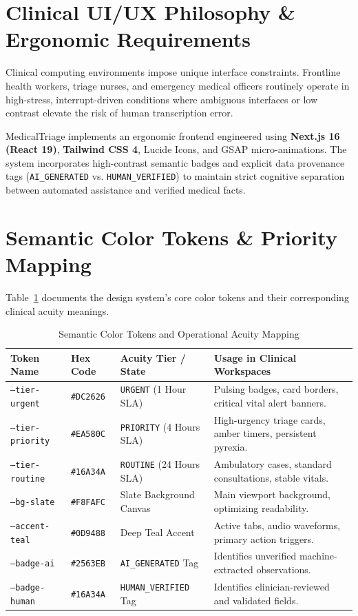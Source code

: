 \documentclass[11pt,a4paper,oneside]{report}
\begin{document}
\section{Clinical UI/UX Philosophy \& Ergonomic Requirements}
Clinical computing environments impose unique interface constraints. Frontline health workers, triage nurses, and emergency medical officers routinely operate in high-stress, interrupt-driven conditions where ambiguous interfaces or low contrast elevate the risk of human transcription error.

MedicalTriage implements an ergonomic frontend engineered using \textbf{Next.js 16 (React 19)}, \textbf{Tailwind CSS 4}, Lucide Icons, and GSAP micro-animations. The system incorporates high-contrast semantic badges and explicit data provenance tags (\texttt{AI\_GENERATED} vs. \texttt{HUMAN\_VERIFIED}) to maintain strict cognitive separation between automated assistance and verified medical facts.

\section{Semantic Color Tokens \& Priority Mapping}
Table~\ref{tab:color_tokens} documents the design system's core color tokens and their corresponding clinical acuity meanings.

\begin{table}[htbp]
  \centering
  \small
  \caption{Semantic Color Tokens and Operational Acuity Mapping}
  \label{tab:color_tokens}
  \begin{tabularx}{\textwidth}{lp{2.0cm}p{3.2cm}X}
    \toprule
    \textbf{Token Name} & \textbf{Hex Code} & \textbf{Acuity Tier / State} & \textbf{Usage in Clinical Workspaces} \\
    \midrule
    \texttt{--tier-urgent} & \texttt{\#DC2626} & \texttt{URGENT} (1 Hour SLA) & Pulsing badges, card borders, critical vital alert banners. \\
    \addlinespace
    \texttt{--tier-priority} & \texttt{\#EA580C} & \texttt{PRIORITY} (4 Hours SLA) & High-urgency triage cards, amber timers, persistent pyrexia. \\
    \addlinespace
    \texttt{--tier-routine} & \texttt{\#16A34A} & \texttt{ROUTINE} (24 Hours SLA) & Ambulatory cases, standard consultations, stable vitals. \\
    \addlinespace
    \texttt{--bg-slate} & \texttt{\#F8FAFC} & Slate Background Canvas & Main viewport background, optimizing readability. \\
    \addlinespace
    \texttt{--accent-teal} & \texttt{\#0D9488} & Deep Teal Accent & Active tabs, audio waveforms, primary action triggers. \\
    \addlinespace
    \texttt{--badge-ai} & \texttt{\#2563EB} & \texttt{AI\_GENERATED} Tag & Identifies unverified machine-extracted observations. \\
    \addlinespace
    \texttt{--badge-human} & \texttt{\#16A34A} & \texttt{HUMAN\_VERIFIED} Tag & Identifies clinician-reviewed and validated fields. \\
    \bottomrule
  \end{tabularx}
\end{table}
\end{document}
